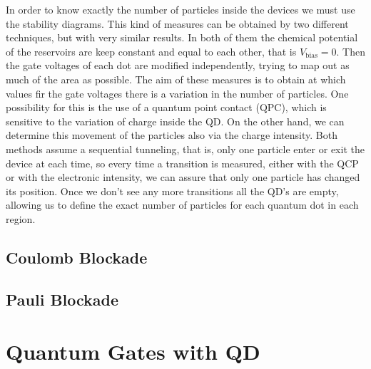 In order to know exactly the number of particles inside the devices we must use the stability diagrams. This kind of measures can be obtained by two different techniques, but with very similar results. In both of them the chemical potential of the reservoirs are keep constant and equal to each other, that is $V_{\text{bias}}=0$. Then the gate voltages of each dot are modified independently, trying to map out as much of the area as possible. The aim of these measures is to obtain at which values fir the gate voltages there is a variation in the number of particles. One possibility for this is the use of a quantum point contact (QPC), which is sensitive to the variation of charge inside the QD. On the other hand, we can determine this movement of the particles also via the charge intensity. Both methods assume a sequential tunneling, that is, only one particle enter or exit the device at each time, so every time a transition is measured, either with the QCP or with the electronic intensity, we can assure that only one particle has changed its position. Once we don't see any more transitions all the QD's are empty, allowing us to define the exact number of particles for each quantum dot in each region.

\subsection{Coulomb Blockade}

\subsection{Pauli Blockade}

\section{Quantum Gates with QD}

